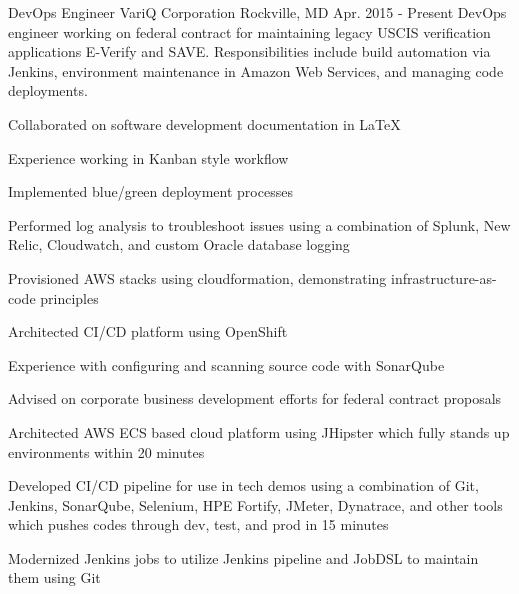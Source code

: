 

\begin{cventries}

  \cventrysix
    {DevOps Engineer} %
    {VariQ Corporation} %
    {Rockville, MD} %
    {Apr. 2015 - Present} %
    {DevOps engineer working on federal contract for maintaining legacy USCIS verification applications E-Verify and SAVE. Responsibilities include build automation via Jenkins, environment maintenance in Amazon Web Services, and managing code deployments.} %
    {
      \begin{cvitems} %
        \item {Collaborated on software development documentation in LaTeX}
        \item {Experience working in Kanban style workflow}
        \item {Implemented blue/green deployment processes}
        \item {Performed log analysis to troubleshoot issues using a combination of Splunk, New Relic, Cloudwatch, and custom Oracle database logging}
        \item {Provisioned AWS stacks using cloudformation, demonstrating infrastructure-as-code principles}
        \item {Architected CI/CD platform using OpenShift}
        \item {Experience with configuring and scanning source code with SonarQube}
        \item {Advised on corporate business development efforts for federal contract proposals}
        \item {Architected AWS ECS based cloud platform using JHipster which fully stands up environments within 20 minutes}
        \item {Developed CI/CD pipeline for use in tech demos using a combination of Git, Jenkins, SonarQube, Selenium, HPE Fortify, JMeter, Dynatrace, and other tools which pushes codes through dev, test, and prod in 15 minutes}
        \item {Modernized Jenkins jobs to utilize Jenkins pipeline and JobDSL to maintain them using Git}

\end{cvitems}}
\end{cventries}
